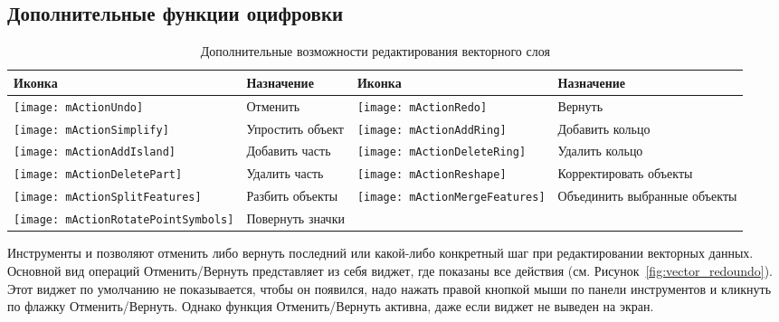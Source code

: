 \subsection{Дополнительные функции оцифровки}
\label{sec:advanced_edit}

\begin{table}[h]
\centering
\small
\begin{tabular}{|l|p{6.9cm}|l|p{6.9cm}|}
\hline \textbf{Иконка} & \textbf{Назначение} & \textbf{Иконка} & \textbf{Назначение} \\
\hline \texttt{[image: mActionUndo]}
   & Отменить
   & \texttt{[image: mActionRedo]}
   & Вернуть \\
\hline \texttt{[image: mActionSimplify]}
   & Упростить объект
   & \texttt{[image: mActionAddRing]}
   & Добавить кольцо \\
\hline \texttt{[image: mActionAddIsland]}
   & Добавить часть
   & \texttt{[image: mActionDeleteRing]}
   & Удалить кольцо \\
\hline \texttt{[image: mActionDeletePart]}
   & Удалить часть
   & \texttt{[image: mActionReshape]}
   & Корректировать объекты \\
\hline \texttt{[image: mActionSplitFeatures]}
   & Разбить объекты
   & \texttt{[image: mActionMergeFeatures]}
   & Объединить выбранные объекты \\
\hline \texttt{[image: mActionRotatePointSymbols]}
   & Повернуть значки
   &
   & \\
\hline
\end{tabular}
\caption{Дополнительные возможности редактирования векторного слоя}\label{tab:advanced_editing}
\end{table}


Инструменты  и
 позволяют отменить либо вернуть
последний или какой-либо конкретный шаг при редактировании векторных данных.
Основной вид операций Отменить/Вернуть представляет из себя виджет, где
показаны все действия (см. Рисунок~\ref{fig:vector_redoundo}). Этот виджет
по умолчанию не показывается, чтобы он появился, надо нажать правой кнопкой
мыши по панели инструментов и кликнуть по флажку Отменить/Вернуть. Однако
функция Отменить/Вернуть активна, даже если виджет не выведен на экран.


